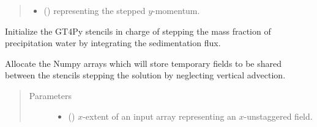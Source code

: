 \documentclass[letterpaper,10pt,english]{sphinxmanual}
\begin{document}
\begin{fulllineitems}
\begin{fulllineitems}
\begin{quote}
\begin{description}
\begin{itemize}
\item {} 
 () \textendash{}  representing the stepped \(y\)-momentum.

\end{itemize}


\end{description}\end{quote}

\end{fulllineitems}


\begin{fulllineitems}
\label{\detokenize{api:dycore.prognostic_isentropic_forward_euler.PrognosticIsentropicForwardEuler._stencils_stepping_by_integrating_sedimentation_flux_initialize}}
Initialize the GT4Py stencils in charge of stepping the mass fraction of precipitation water by
integrating the sedimentation flux.

\end{fulllineitems}


\begin{fulllineitems}
\label{\detokenize{api:dycore.prognostic_isentropic_forward_euler.PrognosticIsentropicForwardEuler._stencils_stepping_by_neglecting_vertical_advection_allocate_temporaries}}
Allocate the Numpy arrays which will store temporary fields to be shared between the stencils
stepping the solution by neglecting vertical advection.
\begin{quote}\begin{description}
\item[{Parameters}] \leavevmode\begin{itemize}
\item {} 
 () \textendash{} \(x\)-extent of an input array representing an \(x\)-unstaggered field.


\end{itemize}
\end{description}
\end{quote}
\end{fulllineitems}
\end{fulllineitems}
\end{document}

